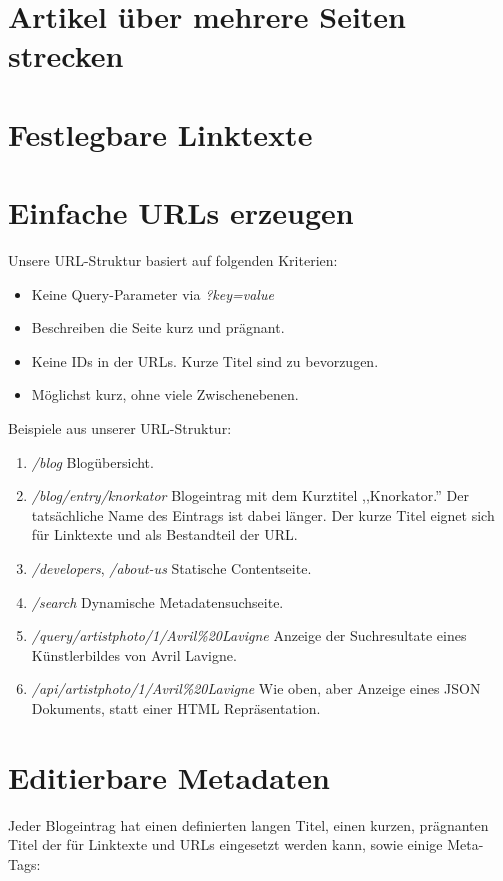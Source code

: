 \section{Artikel über mehrere Seiten strecken}



\section{Festlegbare Linktexte}

\section{Einfache URLs erzeugen}
Unsere URL-Struktur basiert auf folgenden Kriterien:
\begin{itemize}
\item Keine Query-Parameter via \emph{?key=value}
\item Beschreiben die Seite kurz und prägnant.
\item Keine IDs in der URLs. Kurze Titel sind zu bevorzugen.
\item Möglichst kurz, ohne viele Zwischenebenen.
\end{itemize}


Beispiele aus unserer URL-Struktur:
\begin{enumerate}
    \item \emph{/blog} Blogübersicht.
    \item \emph{/blog/entry/knorkator} Blogeintrag mit dem Kurztitel ,,Knorkator.''
          Der tatsächliche Name des Eintrags ist dabei länger. Der kurze Titel
          eignet sich für Linktexte und als Bestandteil der URL.
    \item \emph{/developers}, \emph{/about-us} Statische Contentseite.
    \item \emph{/search} Dynamische Metadatensuchseite.
    \item \emph{/query/artistphoto/1/Avril\%20Lavigne} Anzeige der Suchresultate
    eines Künstlerbildes von Avril Lavigne.
    \item \emph{/api/artistphoto/1/Avril\%20Lavigne} Wie oben, aber Anzeige
    eines JSON Dokuments, statt einer HTML Repräsentation.
\end{enumerate}

\section{Editierbare Metadaten}
Jeder Blogeintrag hat einen definierten langen Titel, einen kurzen, prägnanten
Titel der für Linktexte und URLs eingesetzt werden kann, sowie einige Meta-Tags:


